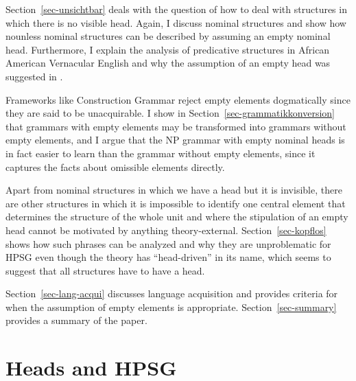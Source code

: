 \documentclass[output=paper
  ,nobabel
  ,draftmode
  ,uniformtopskip %
  ,colorlinks, citecolor=brown
]{langscibook}
\begin{document}
Section~\ref{sec-unsichtbar} deals with the question of how to deal with structures in which there
is no visible head. Again, I discuss nominal structures and show how nounless nominal structures can
be described by assuming an empty nominal head. Furthermore, I explain the analysis of predicative
structures in African American Vernacular English and why the assumption of an empty head was
suggested in .

Frameworks like Construction Grammar reject empty elements dogmatically \parencites[]{Goldberg2003b}[]{Goldberg2006a}[]{HT2013a-u}[]{Fillmore2013a-u}[]{Michaelis2013a-u} since they are said to be unacquirable. I show in
Section~\ref{sec-grammatikkonversion} that grammars with empty elements may be transformed into
grammars without empty elements, and I argue that the NP grammar with empty nominal heads is in fact
easier to learn than the grammar without empty elements, since it captures the facts about omissible
elements directly. 

Apart from nominal structures in which we have a head but it is invisible, there are other
structures in which it is impossible to identify one central element that determines the structure
of the whole unit and where the stipulation of an empty head cannot be motivated by anything theory-external. 
Section~\ref{sec-kopflos} shows how such phrases can be analyzed and why they are
unproblematic for HPSG even though the theory has ``head-driven'' in its name, which seems to
suggest that all structures have to have a head. 

Section~\ref{sec-lang-acqui} discusses language acquisition and provides criteria for when the
assumption of empty elements is appropriate. Section~\ref{sec-summary} provides a summary of the paper.


\section{Heads and HPSG}
\label{sec-koepfe-in-hpsg}
        
\end{document}
